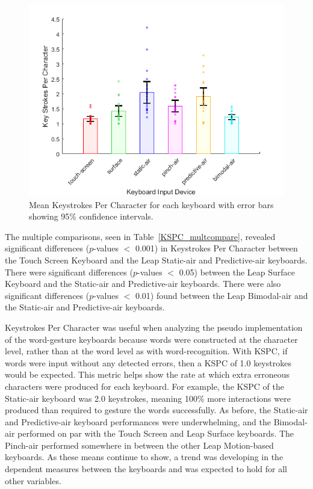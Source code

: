 \begin{figure}[!t]
	\centering
	\includegraphics{Figures/fig_KSPC_mean}
	\caption[Mean Keystrokes Per Character]{Mean Keystrokes Per Character for each keyboard with error bars showing 95\% confidence intervals.}
	\label{fig_KSPC_mean}
\end{figure}

The multiple comparisons, seen in Table~\ref{KSPC_multcompare}, revealed significant differences ($p$-values $<$ 0.001) in Keystrokes Per Character between the Touch Screen Keyboard and the Leap Static-air and Predictive-air keyboards. There were significant differences ($p$-values $<$ 0.05) between the Leap Surface Keyboard and the Static-air and Predictive-air keyboards. There were also significant differences ($p$-values $<$ 0.01) found between the Leap Bimodal-air and the Static-air and Predictive-air keyboards.

Keystrokes Per Character was useful when analyzing the pseudo implementation of the word-gesture keyboards because words were constructed at the character level, rather than at the word level as with word-recognition. With KSPC, if words were input without any detected errors, then a KSPC of 1.0 keystrokes would be expected. This metric helps show the rate at which extra erroneous characters were produced for each keyboard. For example, the KSPC of the Static-air keyboard was 2.0 keystrokes, meaning 100\% more interactions were produced than required to gesture the words successfully. As before, the Static-air and Predictive-air keyboard performances were underwhelming, and the Bimodal-air performed on par with the Touch Screen and Leap Surface keyboards. The Pinch-air performed somewhere in between the other Leap Motion-based keyboards. As these means continue to show, a trend was developing in the dependent measures between the keyboards and was expected to hold for all other variables.

